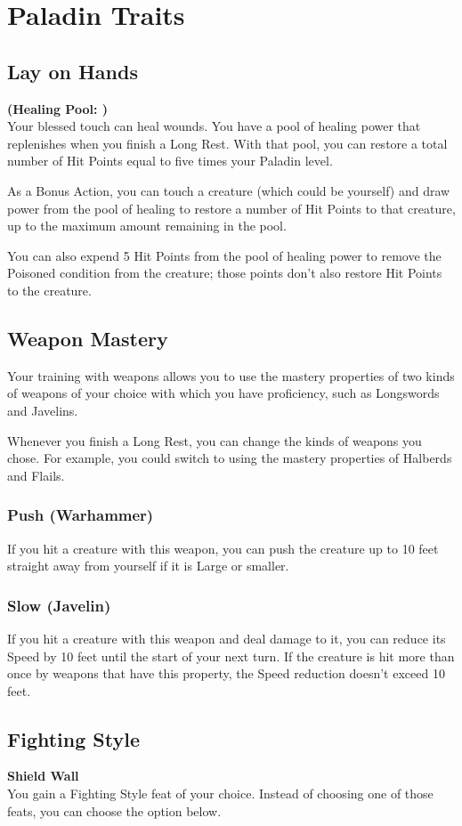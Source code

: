 \documentclass[letterpaper,openany,oneside,twocolumn]{book}
\begin{document}
\section*{Paladin Traits}
\subsection*{Lay on Hands}
\textbf{(Healing Pool: )}\\
Your blessed touch can heal wounds. You have a pool of healing power that replenishes when you finish a Long Rest. With that pool, you can restore a total number of Hit Points equal to five times your Paladin level.

As a Bonus Action, you can touch a creature (which could be yourself) and draw power from the pool of healing to restore a number of Hit Points to that creature, up to the maximum amount remaining in the pool.

You can also expend 5 Hit Points from the pool of healing power to remove the Poisoned condition from the creature; those points don't also restore Hit Points to the creature.
\subsection*{Weapon Mastery}
Your training with weapons allows you to use the mastery properties of two kinds of weapons of your choice with which you have proficiency, such as Longswords and Javelins.

Whenever you finish a Long Rest, you can change the kinds of weapons you chose. For example, you could switch to using the mastery properties of Halberds and Flails.
\subsubsection*{Push (Warhammer)}
If you hit a creature with this weapon, you can push the creature up to 10 feet straight away from yourself if it is Large or smaller.
\subsubsection*{Slow (Javelin)}
If you hit a creature with this weapon and deal damage to it, you can reduce its Speed by 10 feet until the start of your next turn. If the creature is hit more than once by weapons that have this property, the Speed reduction doesn't exceed 10 feet.
\subsection*{Fighting Style}
\textbf{Shield Wall}\\
You gain a Fighting Style feat of your choice. Instead of choosing one of those feats, you can choose the option below.
\end{document}
